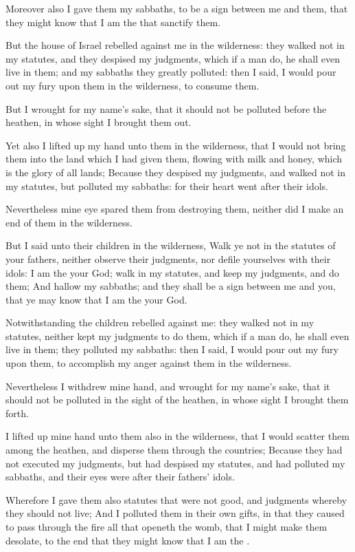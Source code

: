 \verse Moreover also I gave them my sabbaths, to be a sign between me and them, that they might know that I am the \LORD that sanctify them.

\verse But the house of Israel rebelled against me in the wilderness: they walked not in my statutes, and they despised my judgments, which if a man do, he shall even live in them; and my sabbaths they greatly polluted: then I said, I would pour out my fury upon them in the wilderness, to consume them.

\verse But I wrought for my name's sake, that it should not be polluted before the heathen, in whose sight I brought them out.

\verse Yet also I lifted up my hand unto them in the wilderness, that I would not bring them into the land which I had given them, flowing with milk and honey, which is the glory of all lands; \verse Because they despised my judgments, and walked not in my statutes, but polluted my sabbaths: for their heart went after their idols.

\verse Nevertheless mine eye spared them from destroying them, neither did I make an end of them in the wilderness.

\verse But I said unto their children in the wilderness, Walk ye not in the statutes of your fathers, neither observe their judgments, nor defile yourselves with their idols: \verse I am the \LORD your God; walk in my statutes, and keep my judgments, and do them; \verse And hallow my sabbaths; and they shall be a sign between me and you, that ye may know that I am the \LORD your God.

\verse Notwithstanding the children rebelled against me: they walked not in my statutes, neither kept my judgments to do them, which if a man do, he shall even live in them; they polluted my sabbaths: then I said, I would pour out my fury upon them, to accomplish my anger against them in the wilderness.

\verse Nevertheless I withdrew mine hand, and wrought for my name's sake, that it should not be polluted in the sight of the heathen, in whose sight I brought them forth.

\verse I lifted up mine hand unto them also in the wilderness, that I would scatter them among the heathen, and disperse them through the countries; \verse Because they had not executed my judgments, but had despised my statutes, and had polluted my sabbaths, and their eyes were after their fathers' idols.

\verse Wherefore I gave them also statutes that were not good, and judgments whereby they should not live; \verse And I polluted them in their own gifts, in that they caused to pass through the fire all that openeth the womb, that I might make them desolate, to the end that they might know that I am the \LORD.

